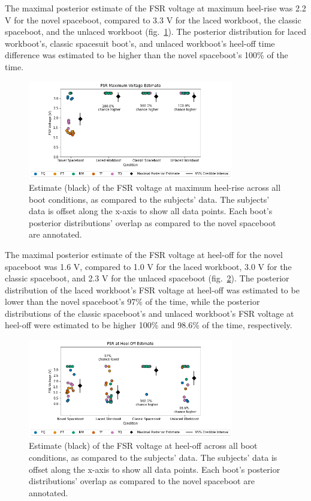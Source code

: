 \documentclass[defaultstyle,11pt]{thesis}
\begin{document}
The maximal posterior estimate of the FSR voltage at maximum heel-rise was 2.2 V for the novel spaceboot, compared to 3.3 V for the laced workboot, the classic spaceboot, and the unlaced workboot (fig.~\ref{fig:SA4-FSRmax}).
The posterior distribution for laced workboot's, classic spacesuit boot's, and unlaced workboot's heel-off time difference was estimated to be higher than the novel spaceboot's 100\% of the time.

\hypertarget{fig:SA4-FSRmax}{%
\begin{figure}
\centering
\includegraphics[width=0.8\textwidth,height=\textheight]{../fig/SA4/FSR_Max.png}
\caption[{FSR voltage at maximum heel-rise posterior estimate}]{Estimate (black) of the FSR voltage at maximum heel-rise across all boot conditions, as compared to the subjects' data. The subjects' data is offset along the x-axis to show all data points. Each boot's posterior distributions' overlap as compared to the novel spaceboot are annotated.}
\label{fig:SA4-FSRmax}
\end{figure}
}

The maximal posterior estimate of the FSR voltage at heel-off for the novel spaceboot was 1.6 V, compared to 1.0 V for the laced workboot, 3.0 V for the classic spaceboot, and 2.3 V for the unlaced spaceboot (fig.~\ref{fig:SA4-FSRH0}).
The posterior distribution of the laced workboot's FSR voltage at heel-off was estimated to be lower than the novel spaceboot's 97\% of the time, while the posterior distributions of the classic spaceboot's and unlaced workboot's FSR voltage at heel-off were estimated to be higher 100\% and 98.6\% of the time, respectively.

\hypertarget{fig:SA4-FSRH0}{%
\begin{figure}
\centering
\includegraphics[width=0.8\textwidth,height=\textheight]{../fig/SA4/FSR_HO.png}
\caption[{FSR voltage at heel-off posterior estimate}]{Estimate (black) of the FSR voltage at heel-off across all boot conditions, as compared to the subjects' data. The subjects' data is offset along the x-axis to show all data points. Each boot's posterior distributions' overlap as compared to the novel spaceboot are annotated.}
\label{fig:SA4-FSRH0}
\end{figure}
}
\end{document}
